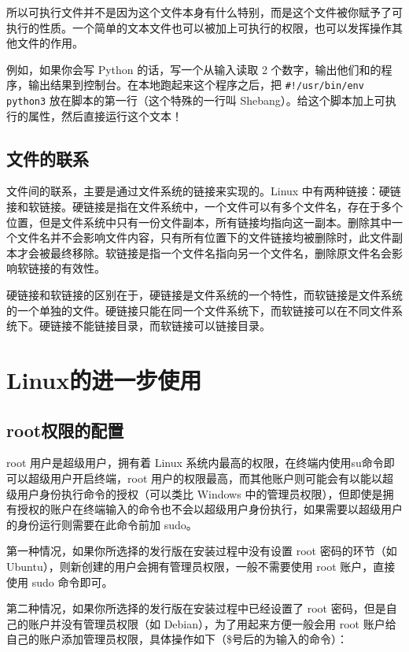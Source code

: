 \documentclass[../main.tex]{subfiles}
\begin{document}
所以可执行文件并不是因为这个文件本身有什么特别，而是这个文件被你赋予了可执行的性质。一个简单的文本文件也可以被加上可执行的权限，也可以发挥操作其他文件的作用。

例如，如果你会写 Python 的话，写一个从输入读取 2 个数字，输出他们和的程序，输出结果到控制台。在本地跑起来这个程序之后，把 \texttt{\#!/usr/bin/env python3} 放在脚本的第一行（这个特殊的一行叫 Shebang）。给这个脚本加上可执行的属性，然后直接运行这个文本！

\subsection{文件的联系}

文件间的联系，主要是通过文件系统的链接来实现的。Linux 中有两种链接：硬链接和软链接。硬链接是指在文件系统中，一个文件可以有多个文件名，存在于多个位置，但是文件系统中只有一份文件副本，所有链接均指向这一副本。删除其中一个文件名并不会影响文件内容，只有所有位置下的文件链接均被删除时，此文件副本才会被最终移除。软链接是指一个文件名指向另一个文件名，删除原文件名会影响软链接的有效性。

硬链接和软链接的区别在于，硬链接是文件系统的一个特性，而软链接是文件系统的一个单独的文件。硬链接只能在同一个文件系统下，而软链接可以在不同文件系统下。硬链接不能链接目录，而软链接可以链接目录。

\section{Linux的进一步使用}

\subsection{root权限的配置}

root 用户是超级用户，拥有着 Linux 系统内最高的权限，在终端内使用su命令即可以超级用户开启终端，root 用户的权限最高，而其他账户则可能会有以能以超级用户身份执行命令的授权（可以类比 Windows 中的管理员权限），但即使是拥有授权的账户在终端输入的命令也不会以超级用户身份执行，如果需要以超级用户的身份运行则需要在此命令前加 sudo。

第一种情况，如果你所选择的发行版在安装过程中没有设置 root 密码的环节（如 Ubuntu），则新创建的用户会拥有管理员权限，一般不需要使用 root 账户，直接使用 sudo 命令即可。

第二种情况，如果你所选择的发行版在安装过程中已经设置了 root 密码，但是自己的账户并没有管理员权限（如 Debian），为了用起来方便一般会用 root 账户给自己的账户添加管理员权限，具体操作如下（\$号后的为输入的命令）：
\end{document}
